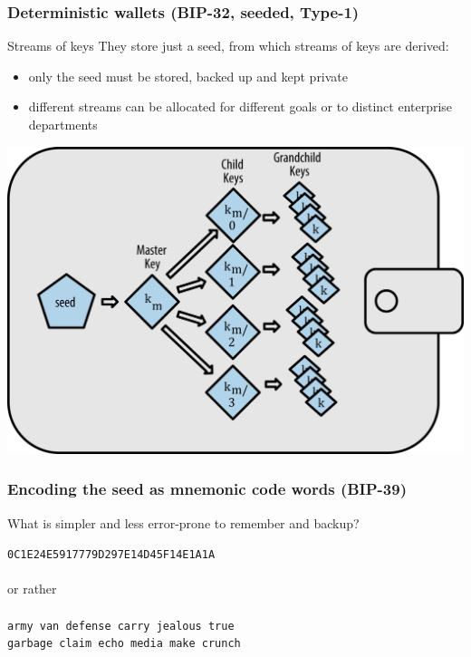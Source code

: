 \documentclass[11pt]{beamer}  %
\begin{document}
\begin{frame}\frametitle{Deterministic wallets (BIP-32, seeded, Type-1)}

  \begin{greenbox}{Streams of keys}
    They store just a seed, from which streams of keys are derived:
    \begin{itemize}
    \item only the seed must be stored, backed up and kept private
    \item different streams can be allocated for different goals or to distinct enterprise departments
    \end{itemize}
  \end{greenbox}

  \medskip

  \begin{center}
    \includegraphics[scale=0.73,clip=false]{pictures/hd-wallet.png}
  \end{center}

\end{frame}

\begin{frame}\frametitle{Encoding the seed as mnemonic code words (BIP-39)}

  \begin{greenbox}{What is simpler and less error-prone to remember and backup?}
    \begin{center}
      \texttt{0C1E24E5917779D297E14D45F14E1A1A}\\
      \mbox{}\\
      or rather\\
      \mbox{}\\
      \texttt{army van defense carry jealous true}\\
      \texttt{garbage claim echo media make crunch}
    \end{center}
  \end{greenbox}

\end{frame}
\end{document}
